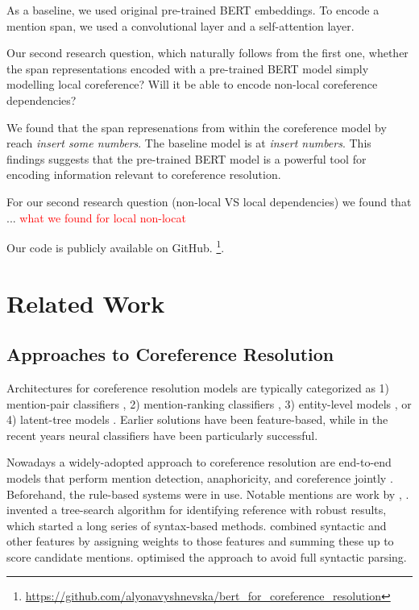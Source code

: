\documentclass[11pt]{article}
\newcommand\todo[1]{\textcolor{red}{#1}}
\begin{document}
As a baseline, we used original pre-trained BERT embeddings. To encode a mention span,  we used a convolutional layer and a  self-attention layer.

Our second research question, which naturally follows from the first one, whether the span representations encoded with a pre-trained BERT model simply modelling local coreference? Will it be able to encode non-local coreference dependencies? 

We found that the span represenations from within the coreference model by \textcite{joshi2019coref} reach \textit{insert some numbers}. The baseline model is at \textit{insert numbers}. This findings suggests that the pre-trained BERT model is a powerful tool for encoding information relevant to coreference resolution. 

For our second research question (non-local VS local dependencies) we found that ... \todo{what we found for local non-locat}

Our code is publicly available on GitHub.  \footnote{\url{https://github.com/alyonavyshnevska/bert_for_coreference_resolution}}.


\section{Related Work} 

\subsection{Approaches to Coreference Resolution}

Architectures for coreference resolution models are typically categorized as 1) mention-pair classifiers \parencite{ng2002identifying, bengtson2008understanding}, 2) mention-ranking classifiers \parencite{durrett2013easy, wiseman2015learning, clark2016deep}, 3) entity-level models \parencite{haghighi-klein-2010-coreference, wiseman-etal-2016-learning}, or 4) latent-tree models \parencite{fernandes-etal-2012-latent, martschat-strube-2015-latent}.
Earlier solutions have been feature-based, while in the recent years neural classifiers have been particularly successful.

Nowadays a widely-adopted approach to coreference resolution are end-to-end models that perform mention detection, anaphoricity, and coreference jointly \parencite{jurafsky2019}. Beforehand, the rule-based systems were in use. Notable mentions are work by \textcite{hobbs1978}, \textcite{lappin1994}. \textcite{hobbs1978} invented a tree-search algorithm for identifying reference with robust results, which started a long series of syntax-based methods.  \textcite{lappin1994} combined syntactic and other features by assigning weights to those features and summing these up to score candidate mentions. \textcite{kennedy1996} optimised the approach to avoid full syntactic parsing. 
\end{document}
